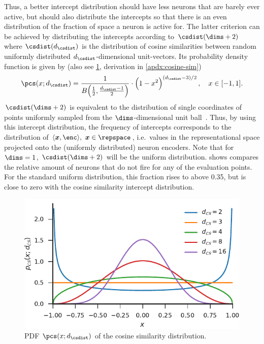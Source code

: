 Thus, a better intercept distribution should have less neurons that are barely ever active, but should also distribute the intercepts so that there is an even distribution of the fraction of space a neuron is active for.
The latter criterion can be achieved by distributing the intercepts according to $\csdist(\dims+2)$ where $\csdist(d_{\csdist})$ is the distribution of cosine similarities between random uniformly distributed $d_{\csdist}$-dimensional unit-vectors.
Its probability density function is given by (also see \cref{fig:cosine-sim}, derivation in \cref{apdx:cosine-sim})
\begin{equation}
\pcs(x; d_{\csdist}) = \frac{1}{B\!\del{\frac{1}{2}, \frac{d_{\csdist} - 1}{2}}} \cdot \del{1 - x^2}^{\del{d_{\csdist} - 3} / 2},\quad x \in [-1, 1] \text{.}\label{eqn:pcs}
\end{equation}
$\csdist(\dims+2)$ is equivalent to the distribution of single coordinates of points uniformly sampled from the $\dims$-dimensional unit ball~\parencite{voelker2017}.
Thus, by using this intercept distribution, the frequency of intercepts corresponds to the distribution of $\langle \vc x, \enc \rangle,\ \vc x \in \repspace$, i.e.\ values in the representational space projected onto the (uniformly distributed) neuron encoders.
Note that for $\dims = 1$, $\csdist(\dims + 2)$ will be the uniform distribution.
 shows compares the relative amount of neurons that do not fire for any of the evaluation points.
For the standard uniform distribution, this fraction rises to above \num{0.35}, but is close to zero with the cosine similarity intercept distribution.
\begin{figure}
    \centering
    \includegraphics{figures/cosine-sim}
    \caption{PDF $\pcs(x; d_{\csdist})$ of the cosine similarity distribution.}\label{fig:cosine-sim}
\end{figure}
